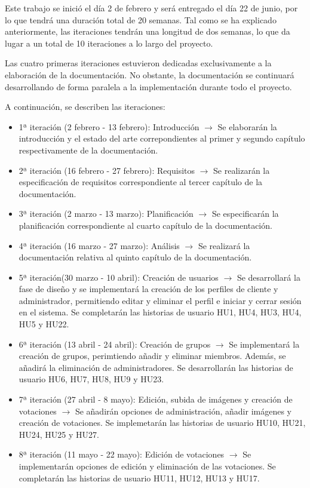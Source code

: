 Este trabajo se inició el día 2 de febrero y será entregado el día 22 de junio, por lo que tendrá una duración total de 20 semanas. Tal como se ha explicado anteriormente, las iteraciones tendrán una longitud de dos semanas, lo que da lugar a un total de 10 iteraciones a lo largo del proyecto. 

Las cuatro primeras iteraciones estuvieron dedicadas exclusivamente a la elaboración de la documentación. No obstante, la documentación se continuará desarrollando de forma paralela a la implementación durante todo el proyecto.

A continuación, se describen las iteraciones:
\begin{itemize}
    \item 1ª iteración (2 febrero - 13 febrero): Introducción $\rightarrow$ Se elaborarán la introducción y el estado del arte correpondientes al primer y segundo capítulo respectivamente de la documentación. 
    \item 2ª iteración (16 febrero - 27 febrero): Requisitos $\rightarrow$ Se realizarán la especificación de requisitos correspondiente al tercer capítulo de la documentación.
    \item 3ª iteración (2 marzo - 13 marzo): Planificación $\rightarrow$ Se especificarán la planificación correspondiente al cuarto capítulo de la documentación.
    \item 4ª iteración (16 marzo - 27 marzo): Análisis $\rightarrow$ Se realizará la documentación relativa al quinto capítulo de la documentación.
    \item 5ª iteración(30 marzo - 10 abril): Creación de usuarios $\rightarrow$ Se desarrollará la fase de diseño y se implementará la creación de los perfiles de cliente y administrador, permitiendo editar y eliminar el perfil e iniciar y cerrar sesión en el sistema. Se completarán las historias de usuario HU1, HU4, HU3, HU4, HU5 y HU22.
    \item 6ª iteración (13 abril - 24 abril): Creación de grupos $\rightarrow$ Se implementará la creación de grupos, perimtiendo añadir y eliminar miembros. Además, se añadirá la eliminación de administradores. Se desarrollarán las historias de usuario HU6, HU7, HU8, HU9 y HU23.
    \item 7ª iteración (27 abril - 8 mayo): Edición, subida de imágenes y creación de votaciones $\rightarrow$ Se añadirán opciones de administración, añadir imágenes y creación de votaciones. Se implemetarán las historias de usuario HU10, HU21, HU24, HU25 y HU27.
    \item 8ª iteración (11 mayo - 22 mayo): Edición de votaciones $\rightarrow$ Se implementarán opciones de edición y eliminación de las votaciones. Se completarán las historias de usuario HU11, HU12, HU13 y HU17.

\end{itemize}

